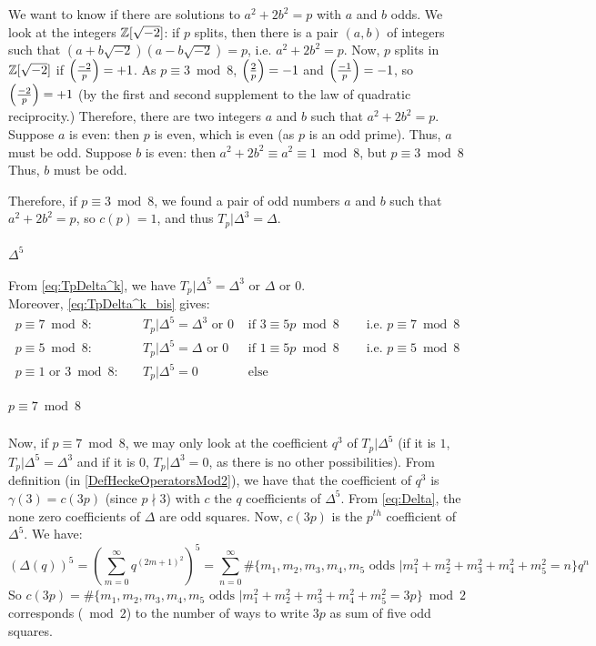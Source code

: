We want to know if there are solutions to $a^2+2b^2=p$ with $a$ and $b$ odds.
We look at the integers $\mathbb{Z}[\sqrt{-2}]$:
if $p$ splits, then there is a pair $(a,b)$ of integers such that $(a+b\sqrt{-2})(a-b\sqrt{-2})=p$, i.e. $a^2+2b^2=p$.
Now, $p$ splits in $\mathbb{Z}[\sqrt{-2}]$ if $\left( \frac{-2}{p} \right)=+1$.
As $p \equiv 3 \bmod 8$, $\left( \frac{2}{p} \right)=-1$ and $\left( \frac{-1}{p} \right)=-1$, so $\left( \frac{-2}{p} \right)=+1$ (by the first and second supplement to the law of quadratic reciprocity.)
Therefore, there are two integers $a$ and $b$ such that $a^2+2b^2=p$.
Suppose $a$ is even: then $p$ is even, which is even (as $p$ is an odd prime).
Thus, $a$ must be odd.
Suppose $b$ is even: then $a^2+2b^2 \equiv a^2 \equiv 1 \bmod 8$, but $p \equiv 3 \bmod 8$
Thus, $b$ must be odd.

Therefore, if $p \equiv 3 \bmod 8$, we found a pair of odd numbers $a$ and $b$ such that $a^2+2b^2=p$, so $c(p)=1$, and thus $T_p|\Delta^3 = \Delta$.

\paragraph{$\Delta^5$}
From \eqref{eq:TpDelta^k}, we have $T_p|\Delta^5 = \Delta^3 \text{ or } \Delta \text{ or } 0$.\\
Moreover, \eqref{eq:TpDelta^k_bis} gives:
\begin{align*}
	p \equiv 7 \bmod 8: & \quad T_p|\Delta^5 = \Delta^3 \text{ or } 0 & \text{ if } 3 \equiv 5p \bmod 8 & \quad \text{ i.e. } p \equiv 7 \bmod 8 \\
	p \equiv 5 \bmod 8: & \quad T_p|\Delta^5 = \Delta \text{ or } 0 & \text{ if } 1 \equiv 5p \bmod 8 & \quad \text{ i.e. } p \equiv 5 \bmod 8 \\
	p \equiv 1 \text{ or } 3 \bmod 8: & \quad T_p|\Delta^5 = 0 & \text{ else } &
\end{align*}

\subparagraph{$p \equiv 7 \bmod 8$}
Now, if $p \equiv 7 \bmod 8$, we may only look at the coefficient $q^3$ of $T_p|\Delta^5$ (if it is $1$, $T_p|\Delta^5 = \Delta^3$ and if it is $0$, $T_p|\Delta^3 = 0$, as there is no other possibilities).
From definition (in \ref{DefHeckeOperatorsMod2}), we have that the coefficient of $q^3$ is $\gamma(3) = c(3p)$ (since $p \nmid 3$) with $c$ the $q$ coefficients of $\Delta^5$.
From \eqref{eq:Delta}, the none zero coefficients of $\Delta$ are odd squares.
Now, $c(3p)$ is the $p^{th}$ coefficient of $\Delta^5$. We have:
$$
\left( \Delta(q) \right)^5
= \left( \sum_{m=0}^{\infty} q^{(2m+1)^2} \right)^5
= \sum_{n=0}^{\infty} \#\{m_1, m_2, m_3, m_4, m_5 \text{ odds } | m_1^2 + m_2^2 + m_3^2 + m_4^2 + m_5^2 = n\} q^n
$$
So $c(3p) = \#\{m_1, m_2, m_3, m_4, m_5 \text{ odds } | m_1^2 + m_2^2 + m_3^2 + m_4^2 + m_5^2 = 3p\} \bmod 2$ corresponds ($\bmod 2$) to the number of ways to write $3p$ as sum of five odd squares.

